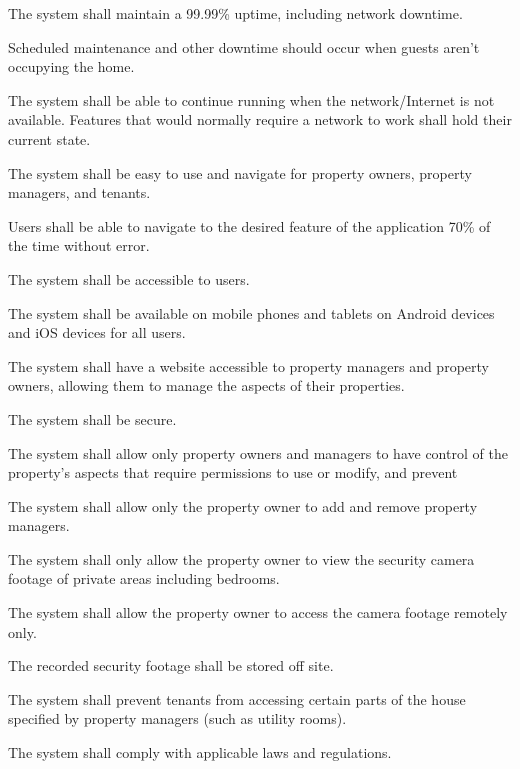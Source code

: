 \documentclass[letter,titlepage,oneside,english]{report}
\begin{document}
\begin{nfr}
\item
  The system shall maintain a 99.99\% uptime, including network downtime.
  \begin{nfr}
  \item
    Scheduled maintenance and other downtime should occur when guests aren't occupying the home.
  \end{nfr}
\item
  The system shall be able to continue running when the network/Internet is not available. Features that would normally require a network to work shall hold their current state.
\item
  The system shall be easy to use and navigate for property owners, property managers, and tenants.
  \begin{nfr}
  \item
    Users shall be able to navigate to the desired feature of the application 70\% of the time without error.
  \end{nfr}
\item
  The system shall be accessible to users.
  \begin{nfr}
  \item
    The system shall be available on mobile phones and tablets on Android devices and iOS devices for all users.
  \item
    The system shall have a website accessible to property managers and property owners, allowing them to manage the aspects of their properties.
  \end{nfr}
\item
  The system shall be secure.
  \begin{nfr}
  \item
    The system shall allow only property owners and managers to have control of the property's aspects that require permissions to use or modify, and prevent
  \item
    The system shall allow only the property owner to add and remove property managers.
  \item
    The system shall only allow the property owner to view the security camera footage of private areas including bedrooms.
    \begin{nfr}
    \item
      The system shall allow the property owner to access the camera footage remotely only.

    \item
      The recorded security footage shall be stored off site.
    \end{nfr}
  \item
    The system shall prevent tenants from accessing certain parts of the house specified by property managers (such as utility rooms).
  \end{nfr}
\item
  The system shall comply with applicable laws and regulations.
\end{nfr}
\end{document}
